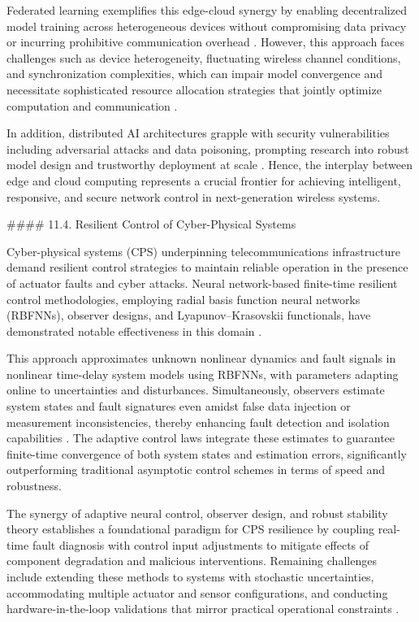 \documentclass[11pt]{article}
\begin{document}
\begin{itemize}
Federated learning exemplifies this edge-cloud synergy by enabling decentralized model training across heterogeneous devices without compromising data privacy or incurring prohibitive communication overhead \cite{10}. However, this approach faces challenges such as device heterogeneity, fluctuating wireless channel conditions, and synchronization complexities, which can impair model convergence and necessitate sophisticated resource allocation strategies that jointly optimize computation and communication \cite{9,10}.

In addition, distributed AI architectures grapple with security vulnerabilities including adversarial attacks and data poisoning, prompting research into robust model design and trustworthy deployment at scale \cite{49,50}. Hence, the interplay between edge and cloud computing represents a crucial frontier for achieving intelligent, responsive, and secure network control in next-generation wireless systems.

#### 11.4. Resilient Control of Cyber-Physical Systems

Cyber-physical systems (CPS) underpinning telecommunications infrastructure demand resilient control strategies to maintain reliable operation in the presence of actuator faults and cyber attacks. Neural network-based finite-time resilient control methodologies, employing radial basis function neural networks (RBFNNs), observer designs, and Lyapunov–Krasovskii functionals, have demonstrated notable effectiveness in this domain \cite{46}.

This approach approximates unknown nonlinear dynamics and fault signals in nonlinear time-delay system models using RBFNNs, with parameters adapting online to uncertainties and disturbances. Simultaneously, observers estimate system states and fault signatures even amidst false data injection or measurement inconsistencies, thereby enhancing fault detection and isolation capabilities \cite{46}. The adaptive control laws integrate these estimates to guarantee finite-time convergence of both system states and estimation errors, significantly outperforming traditional asymptotic control schemes in terms of speed and robustness.

The synergy of adaptive neural control, observer design, and robust stability theory establishes a foundational paradigm for CPS resilience by coupling real-time fault diagnosis with control input adjustments to mitigate effects of component degradation and malicious interventions. Remaining challenges include extending these methods to systems with stochastic uncertainties, accommodating multiple actuator and sensor configurations, and conducting hardware-in-the-loop validations that mirror practical operational constraints \cite{46}.


\end{itemize}
\end{document}
